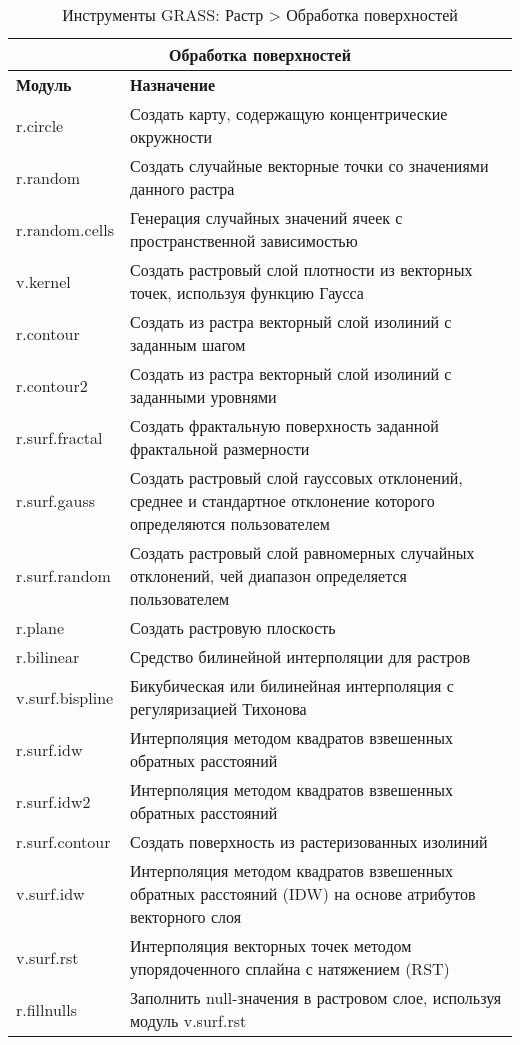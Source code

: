 {\renewcommand{\arraystretch}{0.7}
\begin{table}[H]
\centering
 \begin{tabular}{|p{4cm}|p{11cm}|}
  \hline \multicolumn{2}{|c|}{\textbf{Обработка поверхностей}} \\
  \hline \textbf{Модуль} & \textbf{Назначение} \\
  \hline r.circle & Создать карту, содержащую концентрические окружности \\
  \hline r.random & Создать случайные векторные точки со значениями данного
  растра \\
  \hline r.random.cells & Генерация случайных значений ячеек с
  пространственной зависимостью \\
  \hline v.kernel & Создать растровый слой плотности из векторных
  точек, используя функцию Гаусса \\
  \hline r.contour & Создать из растра векторный слой изолиний с
  заданным шагом \\
  \hline r.contour2 & Создать из растра векторный слой изолиний с
  заданными уровнями \\
  \hline r.surf.fractal & Создать фрактальную поверхность заданной
  фрактальной размерности \\
  \hline r.surf.gauss & Создать растровый слой гауссовых отклонений,
  среднее и стандартное отклонение которого определяются пользователем \\
  \hline r.surf.random & Создать растровый слой равномерных случайных
  отклонений, чей диапазон определяется пользователем \\
  \hline r.plane & Создать растровую плоскость \\
  \hline r.bilinear & Средство билинейной интерполяции для растров \\
  \hline v.surf.bispline & Бикубическая или билинейная интерполяция с
  регуляризацией Тихонова \\
  \hline r.surf.idw & Интерполяция методом квадратов взвешенных обратных
  расстояний \\
  \hline r.surf.idw2 & Интерполяция методом квадратов взвешенных обратных
  расстояний \\
  \hline r.surf.contour & Создать поверхность из растеризованных изолиний \\
  \hline v.surf.idw & Интерполяция методом квадратов взвешенных обратных
  расстояний (IDW) на основе атрибутов векторного слоя \\
  \hline v.surf.rst & Интерполяция векторных точек методом упорядоченного
  сплайна с натяжением (RST) \\
  \hline r.fillnulls & Заполнить null-значения в растровом слое, используя
  модуль v.surf.rst \\
\hline
\end{tabular}
\caption{Инструменты GRASS: Растр > Обработка поверхностей}
\end{table}}

